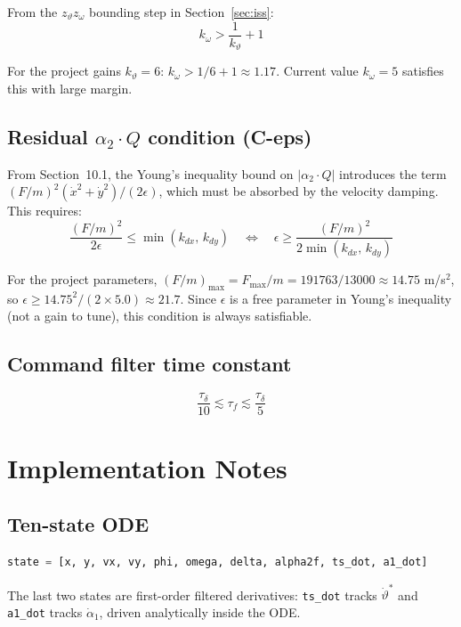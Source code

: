 \documentclass[11pt,a4paper]{article}
\theoremstyle{plain}
\theoremstyle{remark}
\newcommand{\vth}{\vartheta}
\newcommand{\vths}{\vartheta^*}
\newcommand{\zth}{z_{\vth}}
\newcommand{\zom}{z_{\omega}}
\newcommand{\Fmax}{F_{\max}}
\begin{document}
From the $\zth\zom$ bounding step in Section~\ref{sec:iss}:
\[
  k_\omega > \frac{1}{k_\vth} + 1
\]

For the project gains $k_\vth = 6$: $k_\omega > 1/6 + 1 \approx 1.17$. Current value $k_\omega = 5$ satisfies this with large margin.

\subsection*{Residual $\alpha_2 \cdot Q$ condition (C-eps)}

From Section~10.1, the Young's inequality bound on $|\alpha_2 \cdot Q|$ introduces the term $(F/m)^2(\dot x^2 + \dot y^2)/(2\epsilon)$, which must be absorbed by the velocity damping. This requires:
\[
  \frac{(F/m)^2}{2\epsilon} \leq \min(k_{dx},\, k_{dy}) \quad\Longleftrightarrow\quad \epsilon \geq \frac{(F/m)^2}{2\min(k_{dx},\, k_{dy})}
\]

For the project parameters, $(F/m)_{\max} = \Fmax/m = 191763/13000 \approx 14.75$ m/s$^2$, so $\epsilon \geq 14.75^2/(2\times 5.0) \approx 21.7$. Since $\epsilon$ is a free parameter in Young's inequality (not a gain to tune), this condition is always satisfiable.

\subsection*{Command filter time constant}
\[
  \frac{\tau_\delta}{10} \lesssim \tau_f \lesssim \frac{\tau_\delta}{5}
\]

\section{Implementation Notes}
\label{sec:impl}

\subsection*{Ten-state ODE}

\begin{lstlisting}[language=Python]
state = [x, y, vx, vy, phi, omega, delta, alpha2f, ts_dot, a1_dot]
\end{lstlisting}

The last two states are first-order filtered derivatives: \texttt{ts\_dot} tracks $\dot\vths$ and \texttt{a1\_dot} tracks $\dot\alpha_1$, driven analytically inside the ODE.
\end{document}
